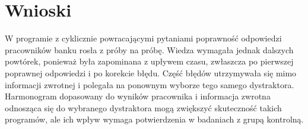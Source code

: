 \section{Wnioski}
W programie z cyklicznie powracającymi pytaniami poprawność odpowiedzi pracowników banku rosła z próby
na próbę. Wiedza wymagała jednak dalszych powtórek, ponieważ była zapominana z upływem czasu, zwłaszcza
po pierwszej poprawnej odpowiedzi i po korekcie błędu. Część błędów utrzymywała się mimo informacji
zwrotnej i polegała na ponownym wyborze tego samego dystraktora. Harmonogram dopasowany do wyników
pracownika i informacja zwrotna odnosząca się do wybranego dystraktora mogą zwiększyć skuteczność
takich programów, ale ich wpływ wymaga potwierdzenia w badaniach z grupą kontrolną.
